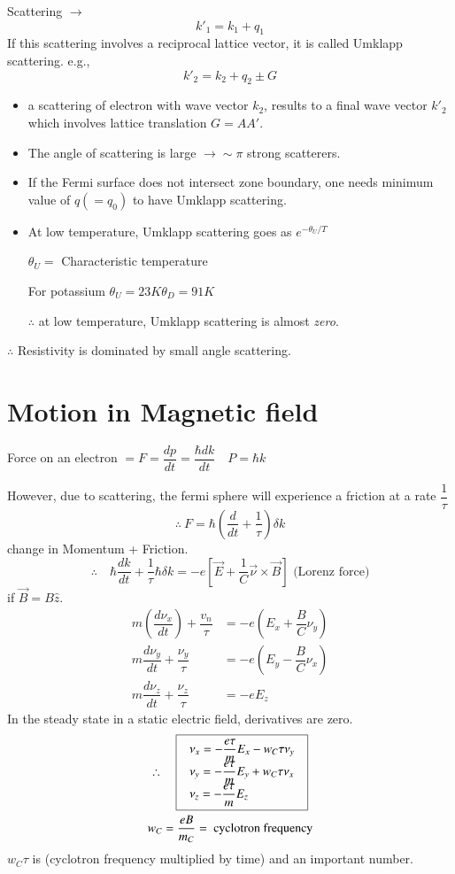 Scattering $\to$
$$
k'_{1}=k_{1}+q_{1}
$$
If this scattering involves a reciprocal lattice vector, it is called Umklapp scattering. e.g.,
$$
k'_{2}=k_{2}+q_{2}\pm G
$$
\begin{itemize}
\itemsep=0pt
\item a scattering of electron with wave vector $k_{2}$, results to a final wave vector $k'_{2}$ which involves lattice translation $G=AA'$.

\item The angle of scattering is large $\to \sim \pi$ strong scatterers.

\item If the Fermi surface does not intersect zone boundary, one needs minimum value of $q(=q_{0})$ to have Umklapp scattering.

\item At low temperature, Umklapp scattering goes as $e^{-\theta_{U}/T}$

$\theta_{U}=$ Characteristic temperature

For potassium $\theta_{U}=23K$\quad $\theta_{D}=91K$

$\therefore$ at low temperature, Umklapp scattering is almost {\em zero}.
\end{itemize}
$\therefore$ Resistivity is dominated by small angle scattering.

\section*{Motion in Magnetic field}

Force on an electron $=F=\dfrac{dp}{dt}=\dfrac{\hbar dk}{dt}\quad P=\hbar k$

However, due to scattering, the fermi sphere will experience a friction at a rate $\dfrac{1}{\tau}$
$$
\therefore \ F=\hbar \left(\dfrac{d}{dt}+\dfrac{1}{\tau}\right)\delta k
$$
change in Momentum + Friction.
$$
\therefore\quad \hbar \dfrac{dk}{dt}+\dfrac{1}{\tau}\hbar \delta k=-e\left[\overrightarrow{E}+\dfrac{1}{C}\overrightarrow{\nu}\times \overrightarrow{B}\right] \text{ (Lorenz force)}
$$
if $\overrightarrow{B}=B\widehat{z}$.
\begin{align*}
m\left(\dfrac{d\nu_{x}}{dt}\right)+\dfrac{v_{n}}{\tau} &= -e\left(E_{x}+\dfrac{B}{C}\nu_{y}\right)\\[3pt]
m\dfrac{d\nu_{y}}{dt}+\dfrac{\nu_{y}}{\tau} &= -e\left(E_{y}-\dfrac{B}{C}\nu_{x}\right)\\
m\dfrac{d\nu_{z}}{dt}+\dfrac{\nu_{z}}{\tau} &= -eE_{z}
\end{align*}
In the steady state in a static electric field, derivatives are zero.
\begin{gather*}
\therefore\quad 
\fbox{
$
\begin{array}{l}
\nu_{x}=-\dfrac{e\tau}{m}E_{x}-w_{C}\tau \nu_{y}\\
\nu_{y}=-\dfrac{e\tau}{m}E_{y}+w_{C}\tau \nu_{x}\\
\nu_{z}=-\dfrac{e\tau}{m}E_{z}
\end{array}
$
}\\
w_{C}=\dfrac{eB}{m_{C}}=\text{ cyclotron frequency}
\end{gather*}
$w_{C}\tau$ is (cyclotron frequency multiplied by time) and an important number.

